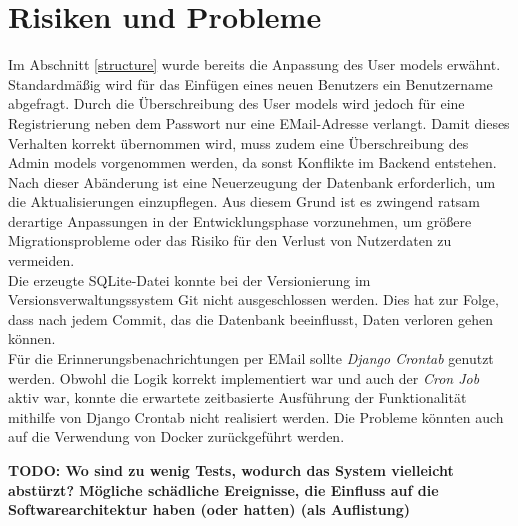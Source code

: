 \documentclass[conference]{IEEEtran}
\begin{document}

\section{Risiken und Probleme}
Im Abschnitt \ref{structure} wurde bereits die Anpassung des User models erwähnt. Standardmäßig wird für das Einfügen eines neuen Benutzers ein Benutzername abgefragt. Durch die Überschreibung des User models wird jedoch für eine Registrierung neben dem Passwort nur eine EMail-Adresse verlangt. Damit dieses Verhalten korrekt übernommen wird, muss zudem eine Überschreibung des Admin models vorgenommen werden, da sonst Konflikte im Backend entstehen. Nach dieser Abänderung ist eine Neuerzeugung der Datenbank erforderlich, um die Aktualisierungen einzupflegen. Aus diesem Grund ist es zwingend ratsam derartige Anpassungen in der Entwicklungsphase vorzunehmen, um größere Migrationsprobleme oder das Risiko für den Verlust von Nutzerdaten zu vermeiden.\\
Die erzeugte SQLite-Datei konnte bei der Versionierung im Versionsverwaltungssystem Git nicht ausgeschlossen werden. Dies hat zur Folge, dass nach jedem Commit, das die Datenbank beeinflusst, Daten verloren gehen können.\\
Für die Erinnerungsbenachrichtungen per EMail sollte \textit{Django Crontab} genutzt werden. Obwohl die Logik korrekt implementiert war und auch der \textit{Cron Job} aktiv war, konnte die erwartete zeitbasierte Ausführung der Funktionalität mithilfe von Django Crontab nicht realisiert werden. Die Probleme könnten auch auf die Verwendung von Docker zurückgeführt werden.


\textbf{TODO: Wo sind zu wenig Tests, wodurch das System vielleicht abstürzt?
	Mögliche schädliche Ereignisse, die Einfluss auf die Softwarearchitektur haben (oder hatten) (als Auflistung)}
\end{document}
